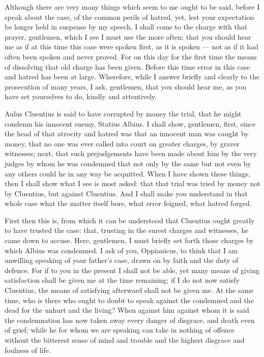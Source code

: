  Although there are very many things which seem to me ought to be said, before I speak about the case, of the common perils of hatred, yet, lest your expectation be longer held in suspense by my speech, I shall come to the charge with that prayer, gentlemen, which I see I must use the more often: that you should hear me as if at this time this case were spoken first, as it is spoken --- not as if it had often been spoken and never proved. For on this day for the first time the means of dissolving that old charge has been given. Before this time error in this case and hatred has been at large. Wherefore, while I answer briefly and clearly to the prosecution of many years, I ask, gentlemen, that you should hear me, as you have set yourselves to do, kindly and attentively.

 Aulus Cluentius is said to have corrupted by money the trial, that he might condemn his innocent enemy, Statius Albius. I shall show, gentlemen, first, since the head of that atrocity and hatred was that an innocent man was caught by money, that no one was ever called into court on greater charges, by graver witnesses; next, that such prejudgements have been made about him by the very judges by whom he was condemned that not only by the same but not even by any others could he in any way be acquitted. When I have shown these things, then I shall show what I see is most asked: that that trial was tried by money not by Cluentius, but against Cluentius. And I shall make you understand in that whole case what the matter itself bore, what error feigned, what hatred forged.

 First then this is, from which it can be understood that Cluentius ought greatly to have trusted the case: that, trusting in the surest charges and witnesses, he came down to accuse. Here, gentlemen, I must briefly set forth those charges by which Albius was condemned. I ask of you, Oppianicus, to think that I am unwilling speaking of your father's case, drawn on by faith and the duty of defence. For if to you in the present I shall not be able, yet many means of giving satisfaction shall be given me at the time remaining; if I do not now satisfy Cluentius, the means of satisfying afterward shall not be given me. At the same time, who is there who ought to doubt to speak against the condemned and the dead for the unhurt and the living? When against him against whom it is said the condemnation has now taken away every danger of disgrace, and death even of grief; while he for whom we are speaking can take in nothing of offence without the bitterest sense of mind and trouble and the highest disgrace and foulness of life.

